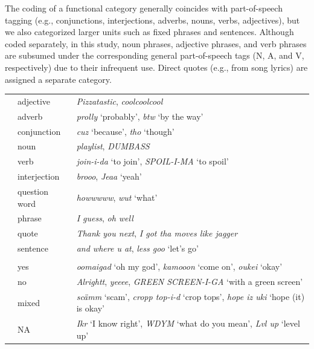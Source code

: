 \documentclass[output=paper]{langscibook}
\begin{document}
The coding of a functional category generally coincides with part-of-speech tagging (e.g., conjunctions, interjections, adverbs, nouns, verbs, adjectives), but we also categorized larger units such as fixed phrases and sentences. Although coded separately, in this study, noun phrases, adjective phrases, and verb phrases are subsumed under the corresponding general part-of-speech tags (N, A, and V, respectively) due to their infrequent use. Direct quotes (e.g., from song lyrics) are assigned a separate category.

\begin{table}
\begin{tabularx}{\textwidth}{@{}l@{}lQ}
\lsptoprule
\\
\midrule
& adjective & \textit{Pizzatastic}, \textit{coolcoolcool}\\
& adverb & \textit{prolly} ‘probably’, \textit{btw} ‘by the way’\\
& conjunction & \textit{cuz} ‘because’, \textit{tho} ‘though’ \\
& noun & \textit{playlist}, \textit{DUMBASS}\\
& verb & \textit{join-i-da} ‘to join’, \textit{SPOIL-I-MA} ‘to spoil’\\
& interjection & \textit{brooo}, \textit{Jeaa} ‘yeah’\\
& question word & \textit{howwwww}, \textit{wut} ‘what’\\
& phrase & \textit{I guess}, \textit{oh well}\\
& quote & \textit{Thank you next}, \textit{I got tha moves like jagger}\\
& sentence & \textit{and where u at}, \textit{less goo} ‘let’s go’\\
\tablevspace
{}\\
\midrule
& yes & \textit{oomaigad} ‘oh my god’, \textit{kamooon} ‘come on’, \textit{oukei} ‘okay’\\
& no & \textit{Alrightt}, \textit{yeeee}, \textit{GREEN SCREEN-I-GA} ‘with a green screen’\\
& mixed & \textit{scämm} ‘scam’, \textit{cropp top-i-d} ‘crop tops’, \textit{hope iz uki} ‘hope (it) is okay’\\
& NA & \textit{Ikr} ‘I know right’, \textit{WDYM} ‘what do you mean’, \textit{Lvl up} ‘level up’\\

\end{tabularx}
\end{table}
\end{document}
